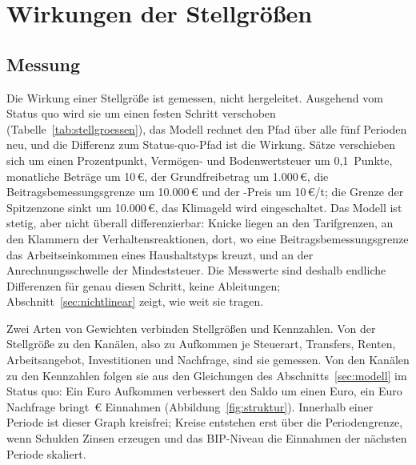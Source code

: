 
\section{Wirkungen der Stellgrößen}
\label{sec:wirkungen}

\subsection{Messung}
\label{sec:messung}

Die Wirkung einer Stellgröße ist gemessen, nicht hergeleitet. Ausgehend vom
Status quo wird sie um einen festen Schritt verschoben
(Tabelle~\ref{tab:stellgroessen}), das Modell rechnet den Pfad über alle fünf
Perioden neu, und die Differenz zum Status-quo-Pfad ist die Wirkung. Sätze
verschieben sich um einen Prozentpunkt, Vermögen- und Bodenwertsteuer um
0,1~Punkte, monatliche Beträge um 10\,\euro, der Grundfreibetrag um
1.000\,\euro, die Beitragsbemessungsgrenze um 10.000\,\euro{} und der
\COz-Preis um 10\,\euro/t; die Grenze der Spitzenzone sinkt um 10.000\,\euro,
das Klimageld wird eingeschaltet. Das Modell ist stetig, aber nicht
überall differenzierbar: Knicke liegen an den Tarifgrenzen, an den
Klammern der Verhaltensreaktionen, dort, wo eine Beitragsbemessungsgrenze das
Arbeitseinkommen eines Haushaltstyps kreuzt, und an der Anrechnungsschwelle der
Mindeststeuer. Die Messwerte sind deshalb endliche Differenzen für genau diesen
Schritt, keine Ableitungen; Abschnitt~\ref{sec:nichtlinear} zeigt, wie weit sie
tragen.

Zwei Arten von Gewichten verbinden Stellgrößen und Kennzahlen. Von der
Stellgröße zu den Kanälen, also zu Aufkommen je Steuerart, Transfers, Renten,
Arbeitsangebot, Investitionen und Nachfrage, sind sie gemessen. Von den Kanälen
zu den Kennzahlen folgen sie aus den Gleichungen des Abschnitts~\ref{sec:modell}
im Status quo: Ein Euro Aufkommen verbessert den Saldo um einen Euro, ein Euro
Nachfrage bringt \Wstabil\,\euro{} Einnahmen (Abbildung~\ref{fig:struktur}).
Innerhalb einer Periode ist dieser Graph kreisfrei; Kreise entstehen erst über
die Periodengrenze, wenn Schulden Zinsen erzeugen und das BIP-Niveau die
Einnahmen der nächsten Periode skaliert.

\begin{table}[tbp]
\centering\small
\caption{Stellgrößen, Status quo und Messschritt. Die oberen stehen am
Verhandlungstisch des Planspiels, geordnet nach Ressort; die weiteren sind
keinem Ressort zugeordnet. Körperschaftsteuer und Rentenbeitrag folgen
zusätzlich dem geltenden Recht (Abschnitt~\ref{sec:aufbau}).}
\label{tab:stellgroessen}

\end{table}

